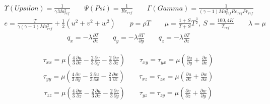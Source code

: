 \begin{align*}
\Upsilon (Upsilon)=\frac{1}{\gamma Ma_{ref}^2}
\ \ \ \ \ \ \ \ \ 
\Psi (Psi)=\frac{1}{Re_{ref}}
\ \ \ \ \ \ \ \ \ 
\Gamma (Gamma)=\frac{1}{\left(\gamma -1 \right)Ma_{ref}^2 Re_{ref} Pr_{ref}}
\end{align*}
\begin{align*}
e=\frac{T}{\gamma \left(\gamma -1\right)Ma_{ref}^2}+\frac{1}{2}\left(u^2+v^2+w^2\right)
\ \ \ \ \ \ \ \ \ 
p=\rho T
\ \ \ \ \ \ \ \ \ 
\mu=\frac{1+S}{T+S}T^\frac{3}{2},\ S=\frac{100,4K}{{T_{ref}}}
\ \ \ \ \ \ \ \ \ 
\lambda=\mu
\end{align*}
\begin{align*}
q_x=-\lambda \frac{\partial T}{\partial x}
\ \ \ \ \ \ \ \ \ 
q_y=-\lambda \frac{\partial T}{\partial y}
\ \ \ \ \ \ \ \ \ 
q_z=-\lambda \frac{\partial T}{\partial z}
\end{align*}

\begin{align*}
\tau_{xx}=\mu \left(\frac{4}{3}\frac{\partial u}{\partial x}-\frac{2}{3}\frac{\partial v}{\partial y}-\frac{2}{3}\frac{\partial w}{\partial z} \right)
\ \ \ \ \ \ \ \ \ 
\tau_{xy}=\tau_{yx}=\mu \left(\frac{\partial u}{\partial y}+\frac{\partial v}{\partial x} \right)
\end{align*}
\begin{align*}
\tau_{yy}=\mu \left(\frac{4}{3}\frac{\partial v}{\partial y}-\frac{2}{3}\frac{\partial u}{\partial x}-\frac{2}{3}\frac{\partial w}{\partial z} \right)
\ \ \ \ \ \ \ \ \ 
\tau_{xz}=\tau_{zx}=\mu \left(\frac{\partial u}{\partial z}+\frac{\partial w}{\partial x} \right)
\end{align*}
\begin{align*}
\tau_{zz}=\mu \left(\frac{4}{3}\frac{\partial w}{\partial z}-\frac{2}{3}\frac{\partial u}{\partial x}-\frac{2}{3}\frac{\partial v}{\partial y} \right)
\ \ \ \ \ \ \ \ \ 
\tau_{yz}=\tau_{zy}=\mu \left(\frac{\partial v}{\partial z}+\frac{\partial w}{\partial y} \right)
\end{align*}

